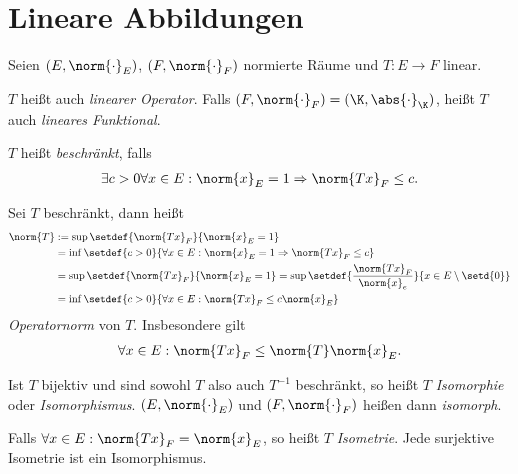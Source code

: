 \chapter{Lineare Abbildungen}

\begin{defn}
\label{defn:2.1}
Seien $(E,\norm{\cdot}_E)$, $(F,\norm{\cdot}_F)$ normierte Räume und $T: E\to
F$ linear.
\begin{defnenum}
  \item $T$ heißt auch \emph{linearer
  Operator}. Falls
  $(F,\norm{\cdot}_F)=(\K,\abs{\cdot}_\K)$, heißt $T$ auch \emph{lineares Funktional}.
  \item $T$ heißt \emph{beschränkt}, falls
\begin{align*}
\exists c > 0 \forall x\in E : \norm{x}_E = 1 \Rightarrow \norm{Tx}_F \le c.
\end{align*}
\item Sei $T$ beschränkt, dann heißt
\begin{align*}
\norm{T} &:= \sup\setdef{\norm{Tx}_F}{\norm{x}_E =1}\\
&= \inf\setdef{c > 0}{\forall x\in E : \norm{x}_E =1 \Rightarrow \norm{Tx}_F \le
c}\\
&= \sup\setdef{\norm{Tx}_F}{\norm{x}_E =1}
= \sup\setdef{\frac{\norm{Tx}_F}{\norm{x}_e}}{x\in E\setminus\setd{0}}\\
&= \inf\setdef{c > 0}{\forall x\in E : \norm{Tx}_F \le c\norm{x}_E}
\end{align*}
\emph{Operatornorm} von $T$. Insbesondere gilt
\begin{align*}
\forall x\in E : \norm{Tx}_F \le \norm{T}\norm{x}_E.
\end{align*}
\item Ist $T$ bijektiv und sind sowohl $T$ also auch $T^{-1}$ beschränkt, so
heißt $T$ \emph{Isomorphie} oder
\emph{Isomorphismus}. $(E,\norm{\cdot}_E)$ und $(F,\norm{\cdot}_F)$ heißen
dann \emph{isomorph}.
\item Falls $\forall x\in E : \norm{Tx}_F =\norm{x}_E$, so heißt $T$
\emph{Isometrie}. Jede surjektive Isometrie ist ein
Isomorphismus.\fishhere
\end{defnenum}
\end{defn}

